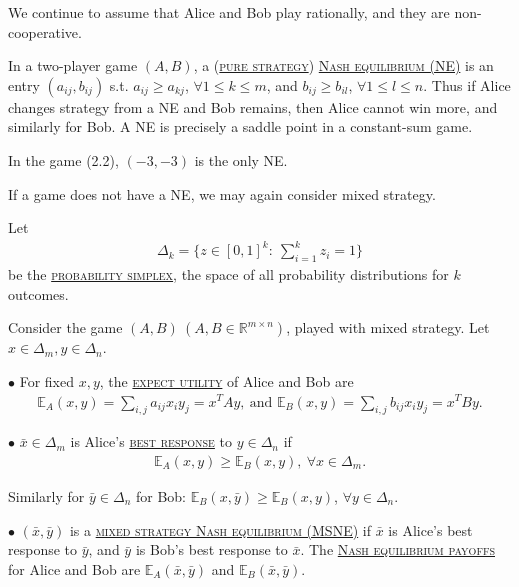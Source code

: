 We continue to assume that Alice and Bob play rationally, and they are non-cooperative. 

\begin{definition}
    In a two-player game $(A, B)$, a (\uline{\textcolor{MarkerColour}{\textsc{pure strategy}}}) \uline{\textcolor{MarkerColour}{\textsc{Nash equilibrium (NE)}}} is an entry $(a_{ij}, b_{ij})$ s.t. $a_{ij}\geqslant a_{kj}$, $\forall 1\leqslant k\leqslant m$, and $b_{ij}\geqslant b_{il}$, $\forall 1\leqslant l\leqslant n$. Thus if Alice changes strategy from a NE and Bob remains, then Alice cannot win more, and similarly for Bob. A NE is precisely a saddle point in a constant-sum game.
\end{definition}

In the game (2.2), $(-3, -3)$ is the only NE.

If a game does not have a NE, we may again consider mixed strategy. 

\begin{definition}
    Let 
    \begin{align*}
        \Delta_k = \{z\in [0, 1]^k : \ \sum\limits_{i=1}^k z_i = 1 \}
    \end{align*}
    be the \uline{\textcolor{MarkerColour}{\textsc{probability simplex}}}, the space of all probability distributions for $k$ outcomes.
\end{definition}

\begin{definition}
    Consider the game $(A, B)\ (A, B\in\mathbb{R}^{m\times n})$, played with mixed strategy. Let $x\in\Delta_m, y\in\Delta_n$.
    
    $\bullet$ For fixed $x, y$, the \uline{\textcolor{MarkerColour}{\textsc{expect utility}}} of Alice and Bob are 
    \begin{align*}
        \mathbb{E}_A(x, y) = \sum\limits_{i, j} a_{ij} x_iy_j = x^TAy, \ \text{and } \mathbb{E}_B(x, y) = \sum\limits_{i, j} b_{ij}x_iy_j = x^TBy.
    \end{align*}

    $\bullet$ $\bar{x}\in\Delta_m$ is Alice's \uline{\textcolor{MarkerColour}{\textsc{best response}}} to $y\in\Delta_n$ if
    \begin{align*}
        \mathbb{E}_A(x, y) \geqslant \mathbb{E}_B(x, y), \ \forall x\in\Delta_m.
    \end{align*}

    Similarly for $\bar{y}\in\Delta_n$ for Bob: $\mathbb{E}_B(x, \bar{y}) \geqslant \mathbb{E}_B(x, y)$, $\forall y\in\Delta_n$.

    $\bullet$ $(\bar{x}, \bar{y})$ is a \uline{\textcolor{MarkerColour}{\textsc{mixed strategy Nash equilibrium (MSNE)}}} if $\bar{x}$ is Alice's best response to $\bar{y}$, and $\bar{y}$ is Bob's best response to $\bar{x}$. The \uline{\textcolor{MarkerColour}{\textsc{Nash equilibrium payoffs}}} for Alice and Bob are $\mathbb{E}_A(\bar{x}, \bar{y})$ and $\mathbb{E}_B(\bar{x}, \bar{y})$.
\end{definition}

